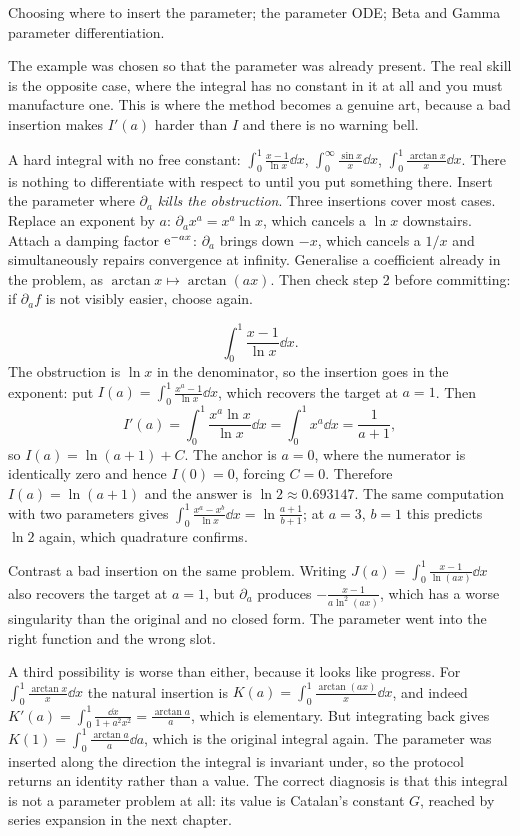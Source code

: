 \begin{seealsob}Choosing where to insert the parameter; the parameter ODE; Beta and Gamma parameter differentiation.\end{seealsob}

The example was chosen so that the parameter was already present. The real skill is the opposite case, where the integral has no constant in it at all and you must manufacture one. This is where the method becomes a genuine art, because a bad insertion makes $I'(a)$ harder than $I$ and there is no warning bell.

\cue A hard integral with no free constant: $\int_0^1\frac{x-1}{\ln x}\dd x$, $\int_0^\infty\frac{\sin x}{x}\dd x$, $\int_0^1\frac{\arctan x}{x}\dd x$. There is nothing to differentiate with respect to until you put something there.
\method Insert the parameter where $\partial_a$ \emph{kills the obstruction}. Three insertions cover most cases. Replace an exponent by $a$: $\partial_a x^{a}=x^{a}\ln x$, which cancels a $\ln x$ downstairs. Attach a damping factor $\mathrm{e}^{-ax}$: $\partial_a$ brings down $-x$, which cancels a $1/x$ and simultaneously repairs convergence at infinity. Generalise a coefficient already in the problem, as $\arctan x\mapsto\arctan(ax)$. Then check step 2 before committing: if $\partial_a f$ is not visibly easier, choose again.

\begin{worked}
\[\int_0^1\frac{x-1}{\ln x}\dd x.\]
The obstruction is $\ln x$ in the denominator, so the insertion goes in the exponent: put $I(a)=\int_0^1\frac{x^{a}-1}{\ln x}\dd x$, which recovers the target at $a=1$. Then
\[I'(a)=\int_0^1\frac{x^{a}\ln x}{\ln x}\dd x=\int_0^1x^{a}\dd x=\frac{1}{a+1},\]
so $I(a)=\ln(a+1)+C$. The anchor is $a=0$, where the numerator is identically zero and hence $I(0)=0$, forcing $C=0$. Therefore $I(a)=\ln(a+1)$ and the answer is $\ln2\approx0.693147$. The same computation with two parameters gives $\int_0^1\frac{x^{a}-x^{b}}{\ln x}\dd x=\ln\frac{a+1}{b+1}$; at $a=3$, $b=1$ this predicts $\ln2$ again, which quadrature confirms.

Contrast a bad insertion on the same problem. Writing $J(a)=\int_0^1\frac{x-1}{\ln(ax)}\dd x$ also recovers the target at $a=1$, but $\partial_a$ produces $-\frac{x-1}{a\ln^{2}(ax)}$, which has a worse singularity than the original and no closed form. The parameter went into the right function and the wrong slot.

A third possibility is worse than either, because it looks like progress. For $\int_0^1\frac{\arctan x}{x}\dd x$ the natural insertion is $K(a)=\int_0^1\frac{\arctan(ax)}{x}\dd x$, and indeed $K'(a)=\int_0^1\frac{\dd x}{1+a^{2}x^{2}}=\frac{\arctan a}{a}$, which is elementary. But integrating back gives $K(1)=\int_0^1\frac{\arctan a}{a}\dd a$, which is the original integral again. The parameter was inserted along the direction the integral is invariant under, so the protocol returns an identity rather than a value. The correct diagnosis is that this integral is not a parameter problem at all: its value is Catalan's constant $G$, reached by series expansion in the next chapter.
\end{worked}

